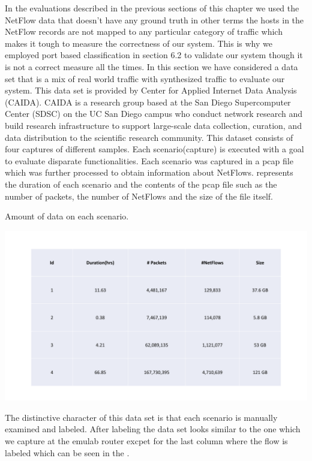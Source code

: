 In the evaluations described in the previous sections of this chapter we used the NetFlow data that doesn't have any ground truth in other terms the hosts in the NetFlow records are not mapped to any particular category of traffic which makes it tough to measure the correctness of our system. This is why we employed port based classification in section 6.2 to validate our system though it is not a correct measure all the times. In this section we have considered a data set that is a mix of real world traffic with synthesized traffic to evaluate our system. This data set is provided by Center for Applied Internet Data Analysis (CAIDA). CAIDA is a research group based at the San Diego Supercomputer Center (SDSC) on the UC San Diego campus who conduct network research and build research infrastructure to support large-scale data collection, curation, and data distribution to the scientific research community. This dataset consists of four captures of different samples. Each scenario(capture) is executed with a goal to evaluate disparate functionalities. Each scenario was captured in a pcap file which was further processed to obtain information about NetFlows.  represents the duration of each scenario and the contents of the pcap file such as the number of packets, the number of NetFlows and the size of the file itself. 
\begin{table}[t]
	\caption{Amount of data on each scenario.}%
	\centerline{\includegraphics[scale = 0.5]{synth_desc.pdf}}	
\end{table}

The distinctive character of this data set is that each scenario is manually examined and labeled. After labeling the data set looks similar to the one which we capture at the emulab router excpet for the last column where the flow is labeled which can be seen in the .

